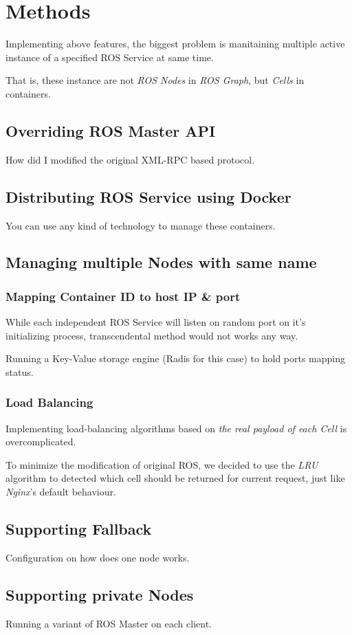 \section{Methods}

Implementing above features, the biggest problem is manitaining multiple active instance of a specified ROS Service at same time.

That is, these instance are not \emph{ROS Nodes} in \emph{ROS Graph}, but \emph{Cells} in containers.

\subsection{Overriding ROS Master API}
How did I modified the original XML-RPC based protocol.

\subsection{Distributing ROS Service using Docker}
You can use any kind of technology to manage these containers.

\subsection{Managing multiple Nodes with same name}
\subsubsection{Mapping Container ID to host IP \& port}
While each independent ROS Service will listen on random port on it's initializing process, transcendental method would not works any way.

Running a Key-Value storage engine (Radis for this case) to hold ports mapping status.

\subsubsection{Load Balancing}
Implementing load-balancing algorithms based on \emph{the real payload of each Cell} is overcomplicated.

To minimize the modification of original ROS, we decided to use the \emph{LRU} algorithm to detected which cell should be returned for current request, just like \emph{Nginx}'s default behaviour.

\subsection{Supporting Fallback}
Configuration on how does one node works. 

\subsection{Supporting private Nodes}
Running a variant of ROS Master on each client.


